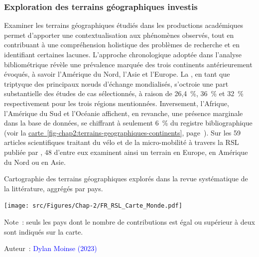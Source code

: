 \begin{refsegment}
\subsubsection*{Exploration des terrains géographiques investis
    \label{chap2:exploration-terrains-geographiques}
    }
    
Examiner les terrains géographiques étudiés dans les productions académiques permet d'apporter une contextualisation aux phénomènes observés, tout en contribuant à une compréhension holistique des problèmes de recherche et en identifiant certaines lacunes. L'approche chronologique adoptée dans l'analyse bibliométrique révèle une prévalence marquée des trois continents antérieurement évoqués, à savoir l'Amérique du Nord, l'Asie et l'Europe. La , en tant que triptyque des principaux nœuds d'échange mondialisés, s'octroie une part substantielle des études de cas sélectionnés, à raison de 26,4~\%, 36~\% et 32~\% respectivement pour les trois régions mentionnées. Inversement, l'Afrique, l'Amérique du Sud et l'Océanie affichent, en revanche, une présence marginale dans la base de données, se chiffrant à seulement 6~\% du registre bibliographique (voir la \hyperref[fig-chap2:terrains-geographiques-continents]{carte~\ref{fig-chap2:terrains-geographiques-continents}}, page~\pageref{fig-chap2:terrains-geographiques-continents}). Sur les 59 articles scientifiques traitant du vélo et de la micro-mobilité à travers la \acrshort{RSL} publiée par \textcolor{blue}{\textcite[298]{zhang_built_2023}}, 48 d'entre eux examinent ainsi un terrain en Europe, en Amérique du Nord ou en Asie.%

    \begin{carte}[h!]\vspace*{4pt}
        \caption{Cartographie des terrains géographiques explorés dans la revue systématique de la littérature, aggrégés par pays.}
        \label{fig-chap2:terrains-geographiques-continents}
        \centerline{\texttt{[image: src/Figures/Chap-2/FR\_RSL\_Carte\_Monde.pdf]}}
        \vspace{5pt}
        \begin{flushleft}\scriptsize{
        Note~: seuls les pays dont le nombre de contributions est égal ou supérieur à deux sont indiqués sur la carte.
        }\end{flushleft}
        \begin{flushright}\scriptsize{
        Auteur~: \textcolor{blue}{Dylan Moinse (2023)}
        }\end{flushright}
    \end{carte}


\end{refsegment}

